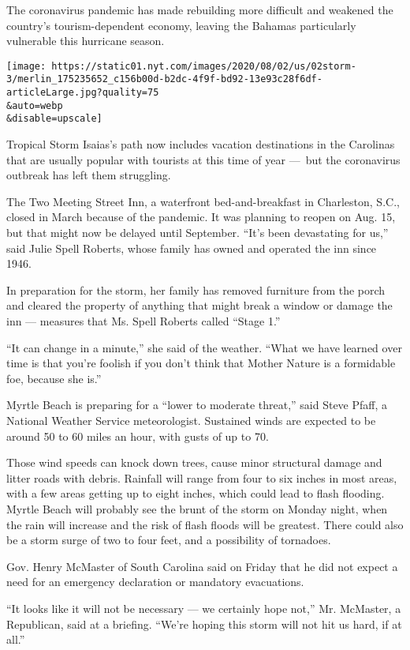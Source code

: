 The coronavirus pandemic has made rebuilding more difficult and weakened
the country's tourism-dependent economy, leaving the Bahamas
particularly vulnerable this hurricane season.

\texttt{[image: https://static01.nyt.com/images/2020/08/02/us/02storm-3/merlin\_175235652\_c156b00d-b2dc-4f9f-bd92-13e93c28f6df-articleLarge.jpg?quality=75\\\&auto=webp\\\&disable=upscale]}

Tropical Storm Isaias's path now includes vacation destinations in the
Carolinas that are usually popular with tourists at this time of year
---~but the coronavirus outbreak has left them struggling.

The Two Meeting Street Inn, a waterfront bed-and-breakfast in
Charleston, S.C., closed in March because of the pandemic. It was
planning to reopen on Aug. 15, but that might now be delayed until
September. ``It's been devastating for us,'' said Julie Spell Roberts,
whose family has owned and operated the inn since 1946.

In preparation for the storm, her family has removed furniture from the
porch and cleared the property of anything that might break a window or
damage the inn --- measures that Ms. Spell Roberts called ``Stage 1.''

``It can change in a minute,'' she said of the weather. ``What we have
learned over time is that you're foolish if you don't think that Mother
Nature is a formidable foe, because she is.''

Myrtle Beach is preparing for a ``lower to moderate threat,'' said Steve
Pfaff, a National Weather Service meteorologist. Sustained winds are
expected to be around 50 to 60 miles an hour, with gusts of up to 70.

Those wind speeds can knock down trees, cause minor structural damage
and litter roads with debris. Rainfall will range from four to six
inches in most areas, with a few areas getting up to eight inches, which
could lead to flash flooding. Myrtle Beach will probably see the brunt
of the storm on Monday night, when the rain will increase and the risk
of flash floods will be greatest. There could also be a storm surge of
two to four feet, and a possibility of tornadoes.

Gov. Henry McMaster of South Carolina said on Friday that he did not
expect a need for an emergency declaration or mandatory evacuations.

``It looks like it will not be necessary --- we certainly hope not,''
Mr. McMaster, a Republican, said at a briefing. ``We're hoping this
storm will not hit us hard, if at all.''

